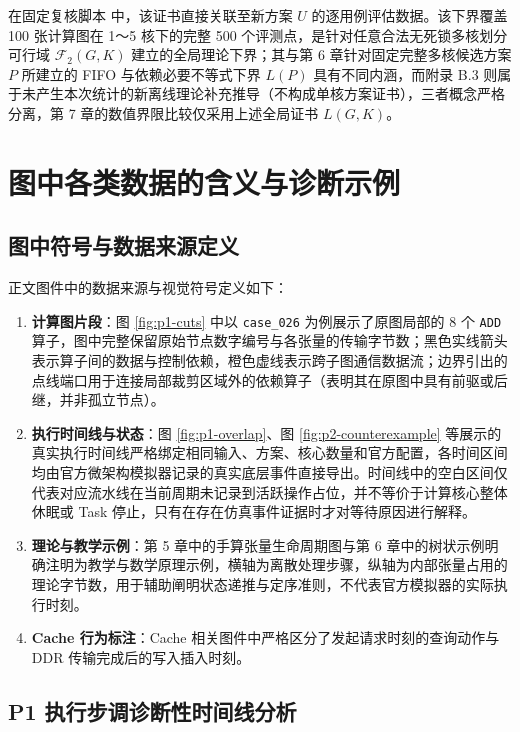 \documentclass[anonymous,withtoc]{gmcm2026}
\providecommand{\tightlist}{\setlength{\itemsep}{0pt}\setlength{\parskip}{0pt}}
\begin{document}
在固定复核脚本 \texttt{} 中，该证书直接关联至新方案 \(U\) 的逐用例评估数据。该下界覆盖 100 张计算图在 1～5 核下的完整 500 个评测点，是针对任意合法无死锁多核划分可行域 \(\mathcal{F}_2(G, K)\) 建立的全局理论下界；其与第 6 章针对固定完整多核候选方案 \(P\) 所建立的 FIFO 与依赖必要不等式下界 \(L(P)\) 具有不同内涵，而附录 B.3 则属于未产生本次统计的新离线理论补充推导（不构成单核方案证书），三者概念严格分离，第 7 章的数值界限比较仅采用上述全局证书 \(L(G, K)\)。

\clearpage
\section{图中各类数据的含义与诊断示例}

\subsection{图中符号与数据来源定义}

正文图件中的数据来源与视觉符号定义如下：

\begin{enumerate}
\def\labelenumi{\arabic{enumi}.}
\tightlist
\item
  \textbf{计算图片段}：图 \ref{fig:p1-cuts} 中以 \texttt{case\_026} 为例展示了原图局部的 8 个 \texttt{ADD} 算子，图中完整保留原始节点数字编号与各张量的传输字节数；黑色实线箭头表示算子间的数据与控制依赖，橙色虚线表示跨子图通信数据流；边界引出的点线端口用于连接局部裁剪区域外的依赖算子（表明其在原图中具有前驱或后继，并非孤立节点）。
\item
  \textbf{执行时间线与状态}：图 \ref{fig:p1-overlap}、图 \ref{fig:p2-counterexample} 等展示的真实执行时间线严格绑定相同输入、方案、核心数量和官方配置，各时间区间均由官方微架构模拟器记录的真实底层事件直接导出。时间线中的空白区间仅代表对应流水线在当前周期未记录到活跃操作占位，并不等价于计算核心整体休眠或 Task 停止，只有在存在仿真事件证据时才对等待原因进行解释。
\item
  \textbf{理论与教学示例}：第 5 章中的手算张量生命周期图与第 6 章中的树状示例明确注明为教学与数学原理示例，横轴为离散处理步骤，纵轴为内部张量占用的理论字节数，用于辅助阐明状态递推与定序准则，不代表官方模拟器的实际执行时刻。
\item
  \textbf{Cache 行为标注}：Cache 相关图件中严格区分了发起请求时刻的查询动作与 DDR 传输完成后的写入插入时刻。
\end{enumerate}

\subsection{P1 执行步调诊断性时间线分析}
\end{document}
